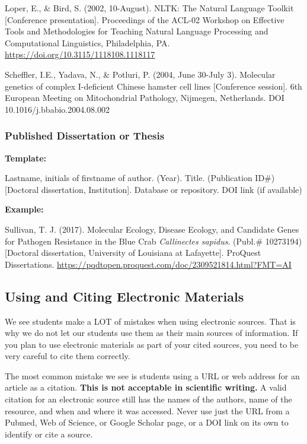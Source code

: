 \documentclass[
]{book}
\begin{document}
Loper, E., \& Bird, S. (2002, 10-August). NLTK: The Natural Language Toolkit {[}Conference presentation{]}. Proceedings of the ACL-02 Workshop on Effective Tools and Methodologies for Teaching Natural Language Processing and Computational Linguistics, Philadelphia, PA. \url{https://doi.org/10.3115/1118108.1118117}

Scheffler, I.E., Yadava, N., \& Potluri, P. (2004, June 30-July 3). Molecular genetics of complex I-deficient Chinese hamster cell lines {[}Conference session{]}. 6th European Meeting on Mitochondrial Pathology, Nijmegen, Netherlands. DOI 10.1016/j.bbabio.2004.08.002

\hypertarget{published-dissertation-or-thesis}{%
\subsubsection{Published Dissertation or Thesis}\label{published-dissertation-or-thesis}}

\textbf{Template:}

Lastname, initials of firstname of author. (Year). Title. (Publication ID\#) {[}Doctoral dissertation, Institution{]}. Database or repository. DOI link (if available)

\textbf{Example:}

Sullivan, T. J. (2017). Molecular Ecology, Disease Ecology, and Candidate Genes for Pathogen Resistance in the Blue Crab \emph{Callinectes sapidus}. (Publ.\# 10273194) {[}Doctoral dissertation, University of Louisiana at Lafayette{]}. ProQuest Dissertations. \url{https://pqdtopen.proquest.com/doc/2309521814.html?FMT=AI}

\hypertarget{using-and-citing-electronic-materials}{%
\subsection{Using and Citing Electronic Materials}\label{using-and-citing-electronic-materials}}

We see students make a LOT of mistakes when using electronic sources. That is why we do not let our students use them as their main sources of information. If you plan to use electronic materials as part of your cited sources, you need to be very careful to cite them correctly.

The most common mistake we see is students using a URL or web address for an article as a citation. \textbf{This is not acceptable in scientific writing.} A valid citation for an electronic source still has the names of the authors, name of the resource, and when and where it was accessed. Never use just the URL from a Pubmed, Web of Science, or Google Scholar page, or a DOI link on its own to identify or cite a source.
\end{document}
